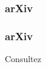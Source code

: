 \begin{frame}
  \frametitle{arXiv}
\end{frame}

\begin{frame}
  \frametitle{arXiv}
  Consultez 
\end{frame}
